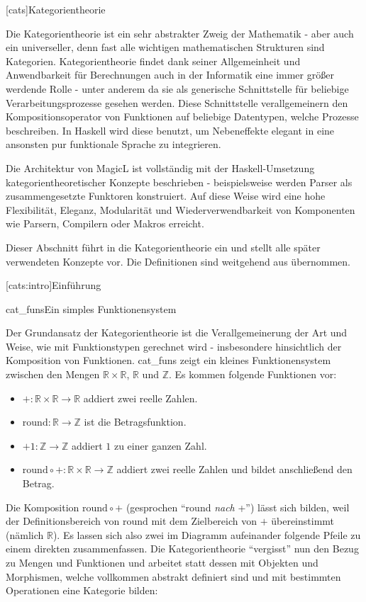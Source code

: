 \documentclass[11pt, a4paper, bibgerm]{scrbook}
\newcommand\lchapter{}
\newcommand\lsection{}
\newcommand\abb{}
\newcommand\fig{}
\newcommand\ato{\rightarrow} %
\begin{document}
\lchapter[cats]{Kategorientheorie}

Die Kategorientheorie ist ein sehr abstrakter Zweig der Mathematik -
aber auch ein universeller, denn fast alle wichtigen mathematischen
Strukturen sind Kategorien. Kategorientheorie findet dank seiner
Allgemeinheit und Anwendbarkeit für Berechnungen auch in der Informatik
eine immer größer werdende Rolle - unter anderem da sie als generische
Schnittstelle für beliebige Verarbeitungsprozesse gesehen werden. Diese
Schnittstelle verallgemeinern den Kompositionsoperator von Funktionen
auf beliebige Datentypen, welche Prozesse beschreiben. In Haskell wird
diese benutzt, um Nebeneffekte elegant in eine ansonsten pur funktionale
Sprache zu integrieren.

Die Architektur von MagicL ist vollständig mit der Haskell-Umsetzung
kategorientheoretischer Konzepte beschrieben - beispielsweise werden
Parser als zusammengesetzte Funktoren konstruiert. Auf diese Weise wird
eine hohe Flexibilität, Eleganz, Modularität und Wiederverwendbarkeit
von Komponenten wie Parsern, Compilern oder Makros erreicht.

Dieser Abschnitt führt in die Kategorientheorie ein und
stellt alle später verwendeten Konzepte vor. Die Definitionen sind
weitgehend aus \cite{Grundlagen} übernommen.

\lsection[cats:intro]{Einführung}

\fig{cat_funs}{Ein simples Funktionensystem}

Der Grundansatz der Kategorientheorie ist die Verallgemeinerung der
Art und Weise, wie mit Funktionstypen gerechnet wird - insbesondere
hinsichtlich der Komposition von Funktionen. \abb{cat_funs} zeigt ein
kleines Funktionensystem zwischen den Mengen $\mathbb{R} \times
\mathbb{R}$, $\mathbb{R}$ und $\mathbb{Z}$. Es kommen folgende
Funktionen vor:
\begin{itemize}
\item $+ : \mathbb{R} \times \mathbb{R} \ato \mathbb{R}$ addiert zwei
  reelle Zahlen.
\item $\mathrm{round} : \mathbb{R} \ato \mathbb{Z}$ ist die Betragsfunktion.
\item $+1 : \mathbb{Z} \ato \mathbb{Z}$ addiert $1$ zu einer ganzen Zahl.
\item $\mathrm{round} \circ + : \mathbb{R} \times \mathbb{R} \ato \mathbb{Z}$
  addiert zwei reelle Zahlen und bildet anschließend den Betrag.
\end{itemize}

Die Komposition $\mathrm{round} \circ +$ (gesprochen "`round \textit{nach}
+"') lässt sich bilden, weil der Definitionsbereich von $\mathrm{round}$
mit dem Zielbereich von $+$ übereinstimmt (nämlich $\mathbb{R}$). Es
lassen sich also zwei im Diagramm aufeinander folgende Pfeile zu einem
direkten zusammenfassen. Die Kategorientheorie "`vergisst"' nun den
Bezug zu Mengen und Funktionen und arbeitet statt dessen mit Objekten
und Morphismen, welche vollkommen abstrakt definiert sind und mit
bestimmten Operationen eine Kategorie bilden:
\end{document}
